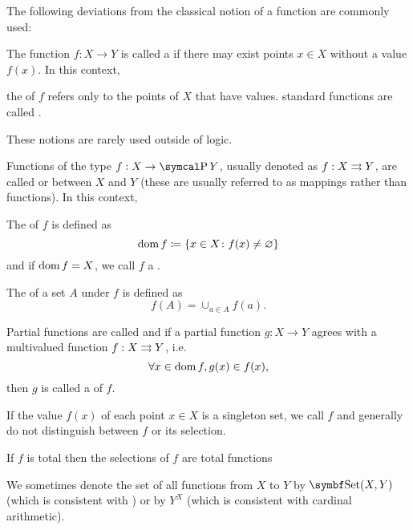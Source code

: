 \begin{definition}
  The following deviations from the classical notion of a function are commonly used:
  \begin{defenum}
     The function \( f: X \to Y \) is called a  if there may exist points \( x \in X \) without a value \( f(x) \). In this context,
    \begin{defenum}
       the  of \( f \) refers only to the points of \( X \) that have values.
       standard functions are called .
    \end{defenum}

    These notions are rarely used outside of logic.

     Functions of the type \( f: X \to \Power Y \), usually denoted as \( f: X \rightrightarrows Y \), are called   or  between \( X \) and \( Y \) (these are usually referred to as mappings rather than functions). In this context,
    \begin{defenum}
       The  of \( f \) is defined as
      \begin{equation*}
        \operatorname{dom} f \coloneqq \{ x \in X \colon f(x) \neq \varnothing \}
      \end{equation*}
      and if \( \operatorname{dom} f = X \), we call \( f \) a .

       The  of a set \( A \) under \( f \) is defined as
      \begin{equation*}
        f(A) = \cup_{a \in A} f(a).
      \end{equation*}

       Partial functions are called  and if a partial function \( g: X \to Y \) agrees with a multivalued function \( f: X \rightrightarrows Y \), i.e.
      \begin{equation*}
        \forall x \in \operatorname{dom} f, g(x) \in f(x),
      \end{equation*}
      then \( g \) is called a  of \( f \).

      If the value \( f(x) \) of each point \( x \in X \) is a singleton set, we call \( f \)  and generally do not distinguish between \( f \) or its selection.

       If \( f \) is total then the selections of \( f \) are total functions
    \end{defenum}
  \end{defenum}

  We sometimes denote the set of all functions from \( X \) to \( Y \) by \( \Cat{Set}(X, Y) \) (which is consistent with ) or by \( Y^X \) (which is consistent with cardinal arithmetic).
\end{definition}

